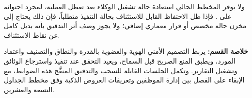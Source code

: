 ولا يوفر المخطط الحالي استعادة حالة تشغيل الوكلاء بعد تعطل العملية، لمجرد احتوائه على . فإذا ظل الاحتفاظ القابل للاستئناف بحالة التنفيذ متطلباً، فإن ذلك يحتاج إلى مخزن حالة مخصص أو قرار معماري إضافي؛ ولا يجوز وصف أثر التدقيق بأنه بديل كامل عن نقاط الاستئناف.

\medskip
\noindent\textbf{خلاصة القسم:} يربط التصميم الأمني الهوية والعضوية بالقدرة والنطاق والتصنيف واعتماد المورد، ويطبق المنع الصريح قبل السماح، ويعيد التحقق عند تنفيذ  واسترجاع الوثائق وتشغيل التقارير. وتكمل الجلسات القابلة للسحب والتدقيق المنقَّح هذه الضوابط، مع الإبقاء على الفصل بين إدارة الموظفين وتعريفات العروض الذكية وفق مخطط الجداول التسعة والعشرين.
